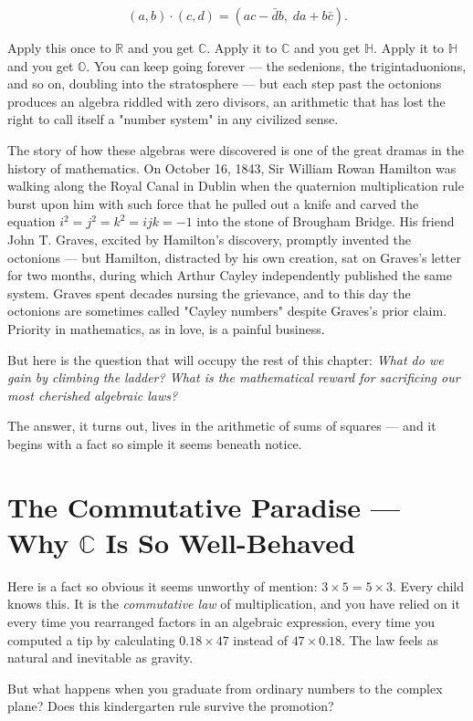 \documentclass[11pt,twoside,openright]{book}
\theoremstyle{definition}
\theoremstyle{remark}
\begin{document}
\[(a, b) \cdot (c, d) = (ac - \bar{d}b,\; da + b\bar{c}).\]

Apply this once to $\mathbb{R}$ and you get $\mathbb{C}$. Apply it to $\mathbb{C}$ and you get $\mathbb{H}$. Apply it to $\mathbb{H}$ and you get $\mathbb{O}$. You can keep going forever --- the sedenions, the trigintaduonions, and so on, doubling into the stratosphere --- but each step past the octonions produces an algebra riddled with zero divisors, an arithmetic that has lost the right to call itself a "number system" in any civilized sense.


The story of how these algebras were discovered is one of the great dramas in the history of mathematics. On October 16, 1843, Sir William Rowan Hamilton was walking along the Royal Canal in Dublin when the quaternion multiplication rule burst upon him with such force that he pulled out a knife and carved the equation $i^2 = j^2 = k^2 = ijk = -1$ into the stone of Brougham Bridge. His friend John T. Graves, excited by Hamilton's discovery, promptly invented the octonions --- but Hamilton, distracted by his own creation, sat on Graves's letter for two months, during which Arthur Cayley independently published the same system. Graves spent decades nursing the grievance, and to this day the octonions are sometimes called "Cayley numbers" despite Graves's prior claim. Priority in mathematics, as in love, is a painful business.

But here is the question that will occupy the rest of this chapter: \textit{What do we gain by climbing the ladder? What is the mathematical reward for sacrificing our most cherished algebraic laws?}

The answer, it turns out, lives in the arithmetic of sums of squares --- and it begins with a fact so simple it seems beneath notice.


\section{The Commutative Paradise --- Why $\mathbb{C}$ Is So Well-Behaved}

Here is a fact so obvious it seems unworthy of mention: $3 \times 5 = 5 \times 3$. Every child knows this. It is the \textit{commutative law} of multiplication, and you have relied on it every time you rearranged factors in an algebraic expression, every time you computed a tip by calculating $0.18 \times 47$ instead of $47 \times 0.18$. The law feels as natural and inevitable as gravity.

But what happens when you graduate from ordinary numbers to the complex plane? Does this kindergarten rule survive the promotion?
\end{document}
